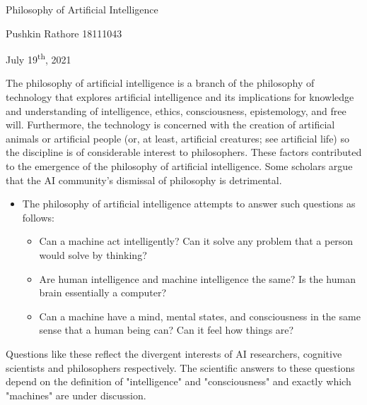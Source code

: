 \documentclass[12pt]{article}
\begin{document}
\begin{center}
{\Large Philosophy of Artificial Intelligence}
\end{center}


\begin{center}
Pushkin Rathore 18111043 
\end{center}


\begin{center}
July 19\textsuperscript{th}, 2021
\end{center}


\vspace{1\baselineskip}
The philosophy of artificial intelligence is a branch of the philosophy of technology that explores artificial intelligence and its implications for knowledge and understanding of intelligence, ethics, consciousness, epistemology, and free will. Furthermore, the technology is concerned with the creation of artificial animals or artificial people (or, at least, artificial creatures; see artificial life) so the discipline is of considerable interest to philosophers. These factors contributed to the emergence of the philosophy of artificial intelligence. Some scholars argue that the AI community's dismissal of philosophy is detrimental.

\begin{itemize}
	\item The philosophy of artificial intelligence attempts to answer such questions as follows:

\vspace{1\baselineskip}
\begin{itemize}
	\item Can a machine act intelligently? Can it solve any problem that a person would solve by thinking?

	\item Are human intelligence and machine intelligence the same? Is the human brain essentially a computer?

	\item Can a machine have a mind, mental states, and consciousness in the same sense that a human being can? Can it feel how things are?

\end{itemize}
\end{itemize}
Questions like these reflect the divergent interests of AI researchers, cognitive scientists and philosophers respectively. The scientific answers to these questions depend on the definition of "intelligence" and "consciousness" and exactly which "machines" are under discussion.
\end{document}
